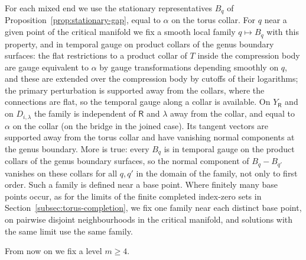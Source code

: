 \documentclass[11pt]{amsart}
\theoremstyle{definition}
\theoremstyle{remark}
\theoremstyle{plain}
\numberwithin{equation}{section}
\begin{document}
For each mixed end we use the stationary representatives $B_q$ of
Proposition~\ref{prop:stationary-gap}, equal to $\alpha$ on the torus collar. For $q$
near a given point of the critical manifold we fix a smooth local family
$q\mapsto B_q$ with this property, and in temporal gauge on product collars of the
genus boundary surfaces: the flat restrictions to a product collar of $T$
inside the compression body are gauge equivalent to $\alpha$ by gauge
transformations depending smoothly on $q$, and these are extended over the
compression body by cutoffs of their logarithms; the primary perturbation is
supported away from the collars, where the connections are flat, so the temporal
gauge along a collar is available. On $Y_\mathsf R$ and on $D_{i,\lambda}$ the family is
independent of $\mathsf R$ and $\lambda$ away from the collar, and equal to $\alpha$ on the
collar (on the bridge in the joined case). Its tangent vectors are supported
away from the torus collar and have vanishing normal components at the genus
boundary. More is true: every $B_q$ is in temporal gauge on the product collars of the
genus boundary surfaces, so the normal component of $B_q-B_{q'}$ vanishes on these
collars for all $q,q'$ in the domain of the family, not only to first order. Such a family
is defined near a base point. Where finitely many base points occur, as for the limits of
the finite completed index-zero sets in Section~\ref{subsec:torus-completion}, we fix one
family near each distinct base point, on pairwise disjoint neighbourhoods in the critical
manifold, and solutions with the same limit use the same family.

From now on we fix a level $m\ge4$.
\end{document}
